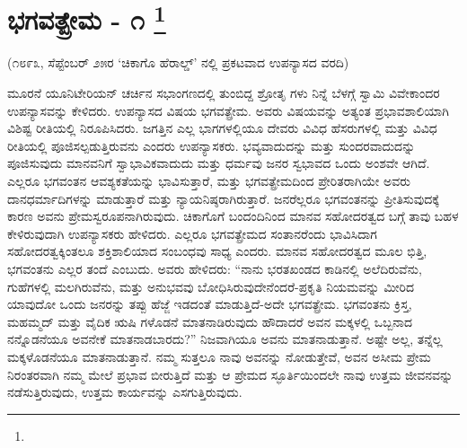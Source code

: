 
\chapter[ಭಗವತ್ಪ್ರೇಮ - ೧ ]{ಭಗವತ್ಪ್ರೇಮ - ೧ \protect\footnote{}}

\centerline{(೧೮೯೩, ಸೆಪ್ಟೆಂಬರ್​ ೨೫ರ ‘ಚಿಕಾಗೊ ಹೆರಾಲ್ಡ್​’ ನಲ್ಲಿ ಪ್ರಕಟವಾದ ಉಪನ್ಯಾಸದ ವರದಿ)}

ಮೂರನೆ ಯೂನಿಟೇರಿಯನ್​ ಚರ್ಚಿನ ಸಭಾಂಗಣದಲ್ಲಿ ತುಂಬಿದ್ದ ಶ್ರೋತೃ ಗಳು ನಿನ್ನೆ ಬೆಳಗ್ಗೆ ಸ್ವಾಮಿ ವಿವೇಕಾಂದರ ಉಪನ್ಯಾಸವನ್ನು ಕೇಳಿದರು. ಉಪನ್ಯಾಸದ ವಿಷಯ ಭಗವತ್ಪ್ರೇಮ. ಅವರು ವಿಷಯವನ್ನು ಅತ್ಯಂತ ಪ್ರಭಾವಶಾಲಿಯಾಗಿ ವಿಶಿಷ್ಟ ರೀತಿಯಲ್ಲಿ ನಿರೂಪಿಸಿದರು. ಜಗತ್ತಿನ ಎಲ್ಲ ಭಾಗಗಳಲ್ಲಿಯೂ ದೇವರು ವಿವಿಧ ಹೆಸರುಗಳಲ್ಲಿ ಮತ್ತು ವಿವಿಧ ರೀತಿಯಲ್ಲಿ ಪೂಜಿಸಲ್ಪಡುತ್ತಿರುವನು ಎಂದರು ಉಪನ್ಯಾಸಕರು. ಭವ್ಯವಾದುದನ್ನು ಮತ್ತು ಸುಂದರವಾದುದನ್ನು ಪೂಜಿಸುವುದು ಮಾನವನಿಗೆ ಸ್ವಾಭಾವಿಕವಾದುದು ಮತ್ತು ಧರ್ಮವು ಜನರ ಸ್ವಭಾವದ ಒಂದು ಅಂಶವೇ ಆಗಿದೆ. ಎಲ್ಲರೂ ಭಗವಂತನ ಆವಶ್ಯಕತೆಯನ್ನು ಭಾವಿಸುತ್ತಾರೆ, ಮತ್ತು ಭಗವತ್ಪ್ರೇಮದಿಂದ ಪ್ರೇರಿತರಾಗಿಯೇ ಅವರು ದಾನಧರ್ಮಾದಿಗಳನ್ನು ಮಾಡುತ್ತಾರೆ ಮತ್ತು ನ್ಯಾಯನಿಷ್ಠರಾಗಿರುತ್ತಾರೆ. ಜನರೆಲ್ಲರೂ ಭಗವಂತನನ್ನು ಪ್ರೀತಿಸುವುದಕ್ಕೆ ಕಾರಣ ಅವನು ಪ್ರೇಮಸ್ವರೂಪನಾಗಿರುವುದು. ಚಿಕಾಗೊಗೆ ಬಂದಂದಿನಿಂದ ಮಾನವ ಸಹೋದರತ್ವದ ಬಗ್ಗೆ ತಾವು ಬಹಳ ಕೇಳಿರುವುದಾಗಿ ಉಪನ್ಯಾಸಕರು ಹೇಳಿದರು. ಎಲ್ಲರೂ ಭಗವತ್ಪ್ರೇಮದ ಸಂತಾನರೆಂದು ಭಾವಿಸಿದಾಗ ಸಹೋದರತ್ವಕ್ಕಿಂತಲೂ ಶಕ್ತಿಶಾಲಿಯಾದ ಸಂಬಂಧವು ಸಾಧ್ಯ ಎಂದರು. ಮಾನವ ಸಹೋದರತ್ವದ ಮೂಲ ಭಿತ್ತಿ, ಭಗವಂತನು ಎಲ್ಲರ ತಂದೆ ಎಂಬುದು. ಅವರು ಹೇಳಿದರು: “ನಾನು ಭರತಖಂಡದ ಕಾಡಿನಲ್ಲಿ ಅಲೆದಿರುವೆನು, ಗುಹೆಗಳಲ್ಲಿ ಮಲಗಿರುವೆನು, ಮತ್ತು ಅನುಭವವು ಬೋಧಿಸಿರುವುದೇನೆಂದರೆ-ಪ್ರಕೃತಿ ನಿಯಮವನ್ನು ಮೀರಿದ ಯಾವುದೋ ಒಂದು ಜನರನ್ನು ತಪ್ಪು ಹೆಜ್ಜೆ ಇಡದಂತೆ ಮಾಡುತ್ತಿದೆ-ಅದೇ ಭಗವತ್ಪ್ರೇಮ. ಭಗವಂತನು ಕ್ರಿಸ್ತ, ಮಹಮ್ಮದ್​ ಮತ್ತು ವೈದಿಕ ಋಷಿ ಗಳೊಡನೆ ಮಾತನಾಡಿರುವುದು ಹೌದಾದರೆ ಅವನ ಮಕ್ಕಳಲ್ಲಿ ಒಬ್ಬನಾದ ನನ್ನೊಡನೆಯೂ ಅವನೇಕೆ ಮಾತನಾಡಬಾರದು?” ನಿಜವಾಗಿಯೂ ಅವನು ಮಾತನಾಡುತ್ತಾನೆ. ಅಷ್ಟೇ ಅಲ್ಲ, ತನ್ನೆಲ್ಲ ಮಕ್ಕಳೊಡನೆಯೂ ಮಾತನಾಡುತ್ತಾನೆ. ನಮ್ಮ ಸುತ್ತಲೂ ನಾವು ಅವನನ್ನು ನೋಡುತ್ತೇವೆ, ಅವನ ಅಸೀಮ ಪ್ರೇಮ ನಿರಂತರವಾಗಿ ನಮ್ಮ ಮೇಲೆ ಪ್ರಭಾವ ಬೀರುತ್ತಿದೆ ಮತ್ತು ಆ ಪ್ರೇಮದ ಸ್ಫೂರ್ತಿಯಿಂದಲೇ ನಾವು ಉತ್ತಮ ಜೀವನವನ್ನು ನಡೆಸುತ್ತಿರುವುದು, ಉತ್ತಮ ಕಾರ್ಯವನ್ನು ಎಸಗುತ್ತಿರುವುದು.

